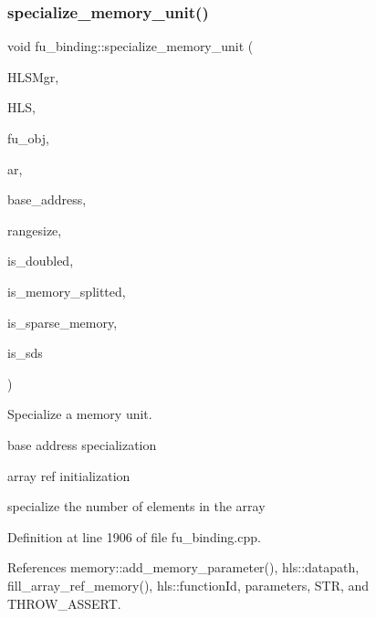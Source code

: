 \mbox{\label{classfu__binding_a9b6236984045631086c488e5cc127902}} 
\subsubsection{\texorpdfstring{specialize\+\_\+memory\+\_\+unit()}{specialize\_memory\_unit()}}
{\footnotesize\ttfamily void fu\+\_\+binding\+::specialize\+\_\+memory\+\_\+unit (\begin{DoxyParamCaption}\item[{const \hyperlink{hls__manager_8hpp_acd3842b8589fe52c08fc0b2fcc813bfe}{H\+L\+S\+\_\+manager\+Ref}}]{H\+L\+S\+Mgr,  }\item[{const \hyperlink{hls_8hpp_a75d0c73923d0ddfa28c4843a802c73a7}{hls\+Ref}}]{H\+LS,  }\item[{\hyperlink{structural__objects_8hpp_a8ea5f8cc50ab8f4c31e2751074ff60b2}{structural\+\_\+object\+Ref}}]{fu\+\_\+obj,  }\item[{unsigned int}]{ar,  }\item[{std\+::string \&}]{base\+\_\+address,  }\item[{unsigned int}]{rangesize,  }\item[{bool}]{is\+\_\+doubled,  }\item[{bool}]{is\+\_\+memory\+\_\+splitted,  }\item[{bool}]{is\+\_\+sparse\+\_\+memory,  }\item[{bool}]{is\+\_\+sds }\end{DoxyParamCaption})}



Specialize a memory unit. 

base address specialization

array ref initialization

specialize the number of elements in the array 

Definition at line 1906 of file fu\+\_\+binding.\+cpp.



References memory\+::add\+\_\+memory\+\_\+parameter(), hls\+::datapath, fill\+\_\+array\+\_\+ref\+\_\+memory(), hls\+::function\+Id, parameters, S\+TR, and T\+H\+R\+O\+W\+\_\+\+A\+S\+S\+E\+RT.



